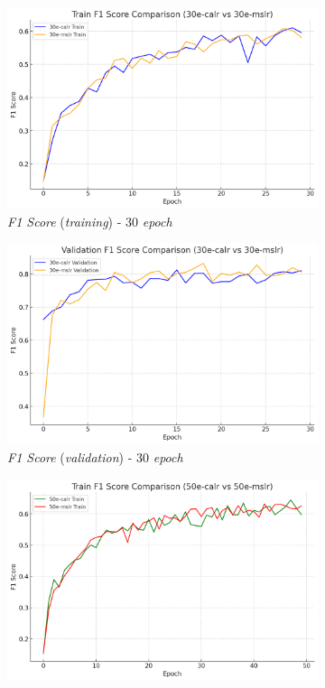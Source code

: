 \begin{figure}[htbp]
  \centering
  \begin{subfigure}{0.45\textwidth}
    \includegraphics[width=\textwidth]{gambar/bab4-train-f1-score-30e.png}
    \caption{\emph{F1 Score} (\emph{training}) - 30 \emph{epoch}}
  \end{subfigure}
  \hfill
  \begin{subfigure}{0.45\textwidth}
    \includegraphics[width=\textwidth]{gambar/bab4-val-f1-score-30e.png}
    \caption{\emph{F1 Score} (\emph{validation}) - 30 \emph{epoch}}
  \end{subfigure}
  \hfill
  \begin{subfigure}{0.45\textwidth}
    \includegraphics[width=\textwidth]{gambar/bab4-train-f1-score-50e.png}

\end{subfigure}
\end{figure}
